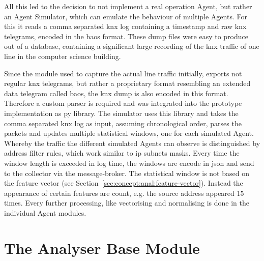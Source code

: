 All this led to the decision to not implement a real operation Agent, but rather an Agent Simulator, which can emulate the behaviour of multiple Agents.
For this it reads a comma separated \gls{knx} log containing a timestamp and raw \gls{knx} telegrams, encoded in the \gls{baos} format.
These dump files were easy to produce out of a database, containing a significant large recording of the \gls{knx} traffic of one line in the computer science building.

Since the module used to capture the actual line traffic initially, exports not regular \gls{knx} telegrams, but rather a proprietary format resembling an extended data telegram called \gls{baos}, the \gls{knx} dump is also encoded in this format.
Therefore a custom parser is required and was integrated into the prototype implementation as \gls{py} library.
The simulator uses this library and takes the comma separated \gls{knx} log as input, assuming chronological order, parses the packets and updates multiple statistical windows, one for each simulated Agent. Whereby the traffic the different simulated Agents can observe is distinguished by address filter rules, which work similar to \gls{ip} subnets masks. 
Every time the window length is exceeded in log time, the windows are encode in \gls{json} and send to the collector via the message-broker.
The statistical window is not based on the feature vector (see Section~\ref{sec:concept:anal:feature-vector}). Instead the appearance of certain features are count, e.g. the source address  appeared $15$ times.
Every further processing, like vectorising and normalising is done in the individual Agent modules.

\newpage
\section{The Analyser Base Module}
\label{sec:impl:base}

